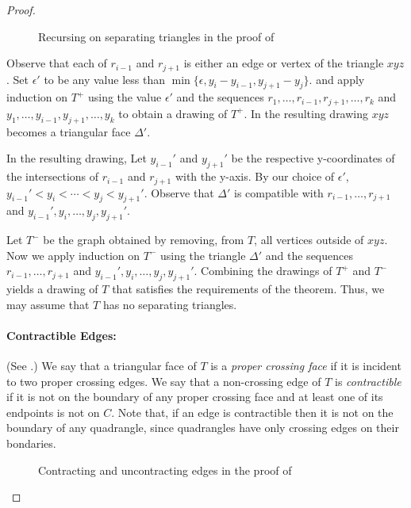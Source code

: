 \documentclass{patmorin}
\begin{document}
\begin{proof}
   \begin{figure}
      \caption{Recursing on separating triangles in the proof of
      }
   \end{figure}

   Observe that each of $r_{i-1}$ and $r_{j+1}$ is either an edge
   or vertex of the triangle $xyz$.  Set $\epsilon'$ to be any
   value less than $\min\{\epsilon,y_{i}-y_{i-1}, y_{j+1}-y_j\}$.
   and apply induction on $T^+$ using the value $\epsilon'$
   and the sequences $r_1,\ldots,r_{i-1},r_{j+1},\ldots,r_k$ and
   $y_1,\ldots,y_{i-1},y_{j+1},\ldots,y_k$ to obtain a drawing of $T^+$.
   In the resulting drawing $xyz$ becomes a triangular face $\Delta'$.

   In the resulting drawing, Let $y_{i-1}'$ and $y_{j+1}'$
   be the respective y-coordinates of the intersections of
   $r_{i-1}$ and $r_{j+1}$ with the y-axis.  By our choice of
   $\epsilon'$, $y_{i-1}'<y_i<\cdots<y_j<y_{j+1}'$.  Observe that
   $\Delta'$ is compatible with $r_{i-1},\ldots,r_{j+1}$ and
   $y_{i-1}',y_i,\ldots,y_j,y_{j+1}'$.

   Let $T^-$ be the graph obtained by removing, from $T$, all
   vertices outside of $xyz$.  Now we apply induction on $T^-$ using
   the triangle $\Delta'$ and the sequences $r_{i-1},\ldots,r_{j+1}$ and
   $y_{i-1}',y_i,\ldots,y_{j},y_{j+1}'$.  Combining the drawings of $T^+$
   and $T^-$ yields a drawing of $T$ that satisfies the requirements of
   the theorem.  Thus, we may assume that $T$ has no separating triangles.

   \paragraph{Contractible Edges:}
   (See .)
   We say that a triangular face of $T$ is a \emph{proper crossing
   face} if it is incident to two proper crossing edges.  We say that
   a non-crossing edge of $T$ is \emph{contractible} if it is not on
   the boundary of any proper crossing face and at least one of its
   endpoints is not on $C$. Note that, if an edge is contractible then
   it is not on the boundary of any quadrangle, since quadrangles have
   only crossing edges on their bondaries.

   \begin{figure}
      \caption{Contracting and uncontracting edges in the proof of
      }
   \end{figure}


\end{proof}
\end{document}
